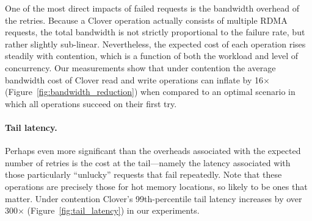 One of the most direct impacts of failed requests is the bandwidth
overhead of the retries.  Because a Clover operation actually
consists of multiple RDMA requests, the total bandwidth is not
strictly proportional to the failure rate, but rather slightly
sub-linear.  Nevertheless, the expected cost of each operation rises
steadily with contention, which is a function of both the workload and
level of concurrency.  Our measurements show that under contention the
average bandwidth cost of Clover read and write operations can inflate
by 16$\times$ (Figure~\ref{fig:bandwidth_reduction}) when compared
to an optimal scenario in which all operations succeed on their first
try.

\paragraph{Tail latency.}

Perhaps even more significant than the overheads associated with the expected
number of retries is the cost at the tail---namely the latency associated with
those particularly ``unlucky'' requests that fail repeatedly.  Note that these
operations are precisely those for hot memory locations, so likely to be
ones that matter.  Under contention
Clover's 99th-percentile tail latency increases by
over 300$\times$ (Figure~\ref{fig:tail_latency}) in our experiments.


